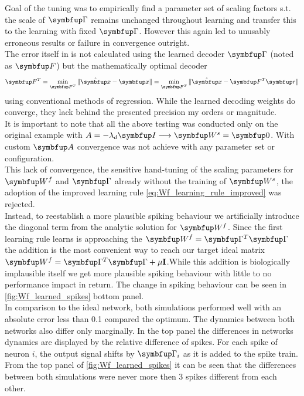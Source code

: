 Goal of the tuning was to empirically find a parameter set of scaling factors s.t. the scale of $\bmu{\Gamma}$ remains unchanged throughout learning and transfer this to the learning with fixed $\bmu{\Gamma}$. However this again led to unusably erroneous results or failure in convergence outright.\\
The error itself in \cite{brendel_learning_2020} is not calculated using the learned decoder $\bmu{\Gamma}$ (noted as $\bmu{F}$) but the mathematically optimal decoder
\begin{equation}
\bmu{F}^T = \min_{\bmu{F}^T} \|\hat{\bmu{x}} - \bmu{x}\| = \min_{\bmu{F}^T} \|\hat{\bmu{x}} - \bmu{F}^T\bmu{r}\|
\end{equation}
using conventional methods of regression. While the learned decoding weights do converge, they lack behind the presented precision my orders or magnitude.\\
It is important to note that all the above testing was conducted only on the original example with $A = -\lambda_d\bmu{I} \longrightarrow \bmu{W}^s = \bmu{0}$. With custom $\bmu{A}$ convergence was not achieve with any parameter set or configuration.\\
This lack of convergence, the sensitive hand-tuning of the scaling parameters for $\bmu{W}^f$ and $\bmu{\Gamma}$ already without the training of $\bmu{W}^s$, the adoption of the improved learning rule \cref{eq:Wf_learning_rule_improved} was rejected.\\
Instead, to reestablish a more plausible spiking behaviour we
artificially introduce the diagonal term from the analytic solution for $\bmu{W}^f$. Since the first learning rule learns is approaching the $\bmu{W}^f = \bmu{\Gamma}^T\bmu{\Gamma}$ the addition is the most convenient way to reach our target ideal matrix $\bmu{W}^f = \bmu{\Gamma}^T\bmu{\Gamma} + \mu\mathbf{I}$.While this addition is biologically implausible itself we get more plausible spiking behaviour with little to no performance impact in return. The change in spiking behaviour can be seen in \cref{fig:Wf_learned_spikes} bottom panel.\\
 In comparison to the ideal network, both simulations performed well with an absolute error less than 0.1 compared the optimum. The dynamics between both networks also differ only marginally. In the top panel the differences in networks dynamics are displayed by the relative difference of spikes. For each spike of neuron $i$, the output signal shifts by $\bmu{\Gamma}_i$ as it is added to the spike train. From the top panel of \cref{fig:Wf_learned_spikes} it can be seen that the differences between both simulations were never more then 3 spikes different from each other.

